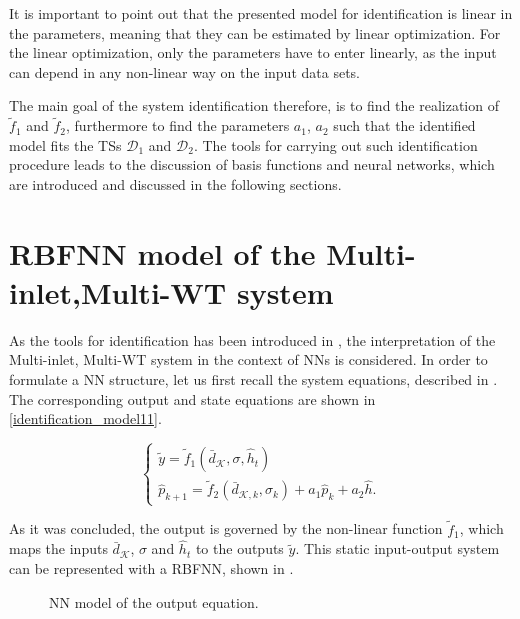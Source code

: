 It is important to point out that the presented model for identification is linear in the parameters, meaning that they can be estimated by linear optimization. For the linear optimization, only the parameters have to enter linearly, as the input can depend in any non-linear way on the input data sets. 

The main goal of the system identification therefore, is to find the realization of $\tilde{f}_1$ and $\tilde{f}_2$, furthermore to find the parameters $a_1$, $a_2$ such that the identified model fits the TSs $\mathcal{D}_{1}$ and $\mathcal{D}_{2}$. The tools for carrying out such identification procedure leads to the discussion of basis functions and neural networks, which are introduced and discussed in the following sections.   

\section{RBFNN model of the Multi-inlet,Multi-WT system}
\label{RBFNN_model_multi_inlet_multi_WT_sys} 

As the tools for identification has been introduced in  , the interpretation of the Multi-inlet, Multi-WT system in the context of NNs is considered. In order to formulate a NN structure, let us first recall the system equations, described in . The corresponding output and state equations are shown in \eqref{identification_model11}. 

\begin{equation}
\begin{cases}
  \label{identification_model11}
    \tilde{y}  = \tilde{f}_1(\bar{d}_{\mathcal{K}}, \sigma, \hat{h}_t )\\
  \hat{p}_{k+1} = \tilde{f}_2(\bar{d}_{\mathcal{K},k}, \sigma_k) + a_1 \hat{p}_k + a_2 \hat{h} .
  \end{cases}
\end{equation} 

As it was concluded, the output is governed by the non-linear function $\tilde{f}_1$, which maps the inputs $\bar{d}_{\mathcal{K}}$, $\sigma$ and $\hat{h}_t $ to the outputs $\tilde{y}$. This static input-output system can be represented with a RBFNN, shown in .

 \begin{figure}[H]
 \centering
  
  \vspace{-7mm}
 \caption{NN model of the output equation.}
 \label{fig:nn_output}
 \end{figure}

